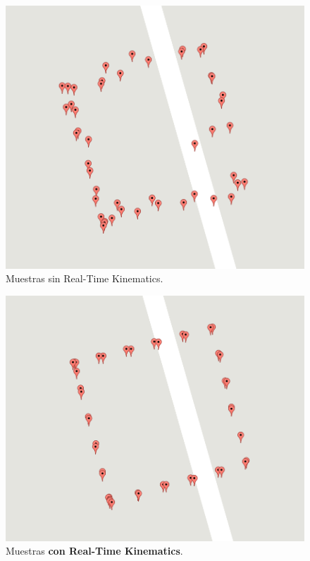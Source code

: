 \begin{figure}[H]
\centering
\includegraphics[scale=0.4]{Figures/NoRtkRes}
\caption[Muestras sin Real-Time Kinematics.]{Muestras sin Real-Time Kinematics.}
\label{fig:NoRtkRes}
\end{figure}

\begin{figure}[H]
\centering
\includegraphics[scale=0.4]{Figures/RtkRes}
\caption[Muestras con Real-Time Kinematics.]{Muestras \textbf{con Real-Time Kinematics}.}
\label{fig:RtkRes}
\end{figure}

